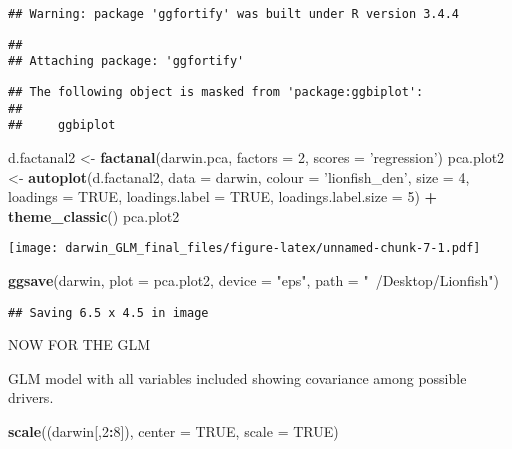 \documentclass[]{article}
\newenvironment{Shaded}{\begin{snugshade}}{\end{snugshade}}
\newcommand{\KeywordTok}[1]{\textcolor[rgb]{0.13,0.29,0.53}{\textbf{#1}}}
\newcommand{\DataTypeTok}[1]{\textcolor[rgb]{0.13,0.29,0.53}{#1}}
\newcommand{\DecValTok}[1]{\textcolor[rgb]{0.00,0.00,0.81}{#1}}
\newcommand{\StringTok}[1]{\textcolor[rgb]{0.31,0.60,0.02}{#1}}
\newcommand{\OtherTok}[1]{\textcolor[rgb]{0.56,0.35,0.01}{#1}}
\newcommand{\OperatorTok}[1]{\textcolor[rgb]{0.81,0.36,0.00}{\textbf{#1}}}
\newcommand{\NormalTok}[1]{#1}
\begin{document}
\begin{verbatim}
## Warning: package 'ggfortify' was built under R version 3.4.4
\end{verbatim}

\begin{verbatim}
## 
## Attaching package: 'ggfortify'
\end{verbatim}

\begin{verbatim}
## The following object is masked from 'package:ggbiplot':
## 
##     ggbiplot
\end{verbatim}

\begin{Shaded}
\begin{Highlighting}[]
\NormalTok{d.factanal2 <-}\StringTok{ }\KeywordTok{factanal}\NormalTok{(darwin.pca, }\DataTypeTok{factors =} \DecValTok{2}\NormalTok{, }\DataTypeTok{scores =} \StringTok{'regression'}\NormalTok{)}
\NormalTok{pca.plot2 <-}\StringTok{ }\KeywordTok{autoplot}\NormalTok{(d.factanal2, }\DataTypeTok{data =}\NormalTok{ darwin, }\DataTypeTok{colour =} \StringTok{'lionfish_den'}\NormalTok{, }\DataTypeTok{size =} \DecValTok{4}\NormalTok{,}
         \DataTypeTok{loadings =} \OtherTok{TRUE}\NormalTok{, }\DataTypeTok{loadings.label =} \OtherTok{TRUE}\NormalTok{, }\DataTypeTok{loadings.label.size  =} \DecValTok{5}\NormalTok{) }\OperatorTok{+}\StringTok{ }\KeywordTok{theme_classic}\NormalTok{()}
\NormalTok{pca.plot2}
\end{Highlighting}
\end{Shaded}

\texttt{[image: darwin\_GLM\_final\_files/figure-latex/unnamed-chunk-7-1.pdf]}

\begin{Shaded}
\begin{Highlighting}[]
\KeywordTok{ggsave}\NormalTok{(darwin, }\DataTypeTok{plot =}\NormalTok{ pca.plot2, }\DataTypeTok{device =} \StringTok{"eps"}\NormalTok{, }\DataTypeTok{path =} \StringTok{"~/Desktop/Lionfish"}\NormalTok{)}
\end{Highlighting}
\end{Shaded}

\begin{verbatim}
## Saving 6.5 x 4.5 in image
\end{verbatim}

NOW FOR THE GLM

GLM model with all variables included showing covariance among possible
drivers.

\begin{Shaded}
\begin{Highlighting}[]
\KeywordTok{scale}\NormalTok{((darwin[,}\DecValTok{2}\OperatorTok{:}\DecValTok{8}\NormalTok{]), }\DataTypeTok{center =} \OtherTok{TRUE}\NormalTok{, }\DataTypeTok{scale =} \OtherTok{TRUE}\NormalTok{)}
\end{Highlighting}
\end{Shaded}
\end{document}
